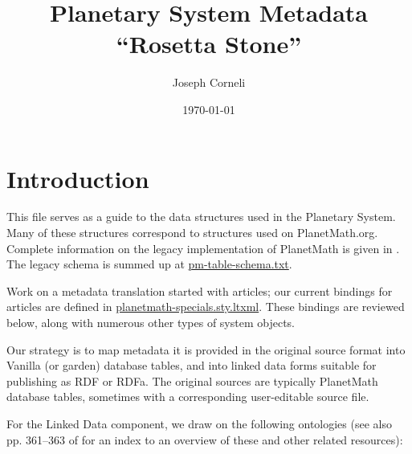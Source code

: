 \documentclass{article}
\begin{document}
\title{Planetary System Metadata ``Rosetta Stone''}
\author{Joseph Corneli}
\date{\today}

\maketitle

\tableofcontents

\section*{Introduction}

This file serves as a guide to the data structures used in
the Planetary System.  Many of these structures correspond
to structures used on PlanetMath.org.  Complete
information on the legacy implementation of PlanetMath is
given in \cite{KrowneThesis}.  The legacy schema is summed
up at
\href{http://trac.mathweb.org/planetary/browser/pmredux-extras/pm-table-schema.txt?rev=HEAD}{pm-table-schema.txt}.

Work on a metadata translation started with articles; our
current bindings for articles are defined in
\href{http://trac.mathweb.org/planetary/browser/src/sty/planetmath-specials.sty.ltxml?rev=HEAD}{planetmath-specials.sty.ltxml}.
These bindings are reviewed below, along with numerous
other types of system objects.

Our strategy is to map metadata it is provided in the
original source format into Vanilla (or garden) database
tables, and into linked data forms suitable for publishing
as RDF or RDFa.  The original sources are typically
PlanetMath database tables, sometimes with a corresponding
user-editable source file.

For the Linked Data component, we draw on the following
ontologies (see also pp. 361--363 of \cite{LangeThesis}
for an index to an overview of these and other related
resources):

\bigskip
\end{document}
